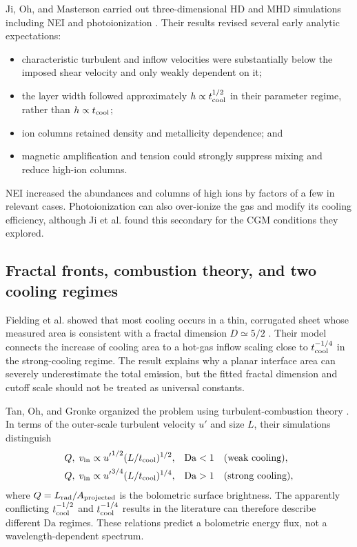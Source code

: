 \documentclass[english,a4paper]{my_memo2}
\newcommand{\tcool}{t_{\rm cool}}
\newcommand{\Da}{\mathrm{Da}}
\begin{document}
Ji, Oh, and Masterson carried out three-dimensional HD and MHD simulations
including NEI and photoionization \cite{Ji2019}.  Their results revised several
early analytic expectations:
\begin{itemize}[leftmargin=*]
\item characteristic turbulent and inflow velocities were substantially below
the imposed shear velocity and only weakly dependent on it;
\item the layer width followed approximately $h\propto\tcool^{1/2}$ in their
parameter regime, rather than $h\propto\tcool$;
\item ion columns retained density and metallicity dependence; and
\item magnetic amplification and tension could strongly suppress mixing and
reduce high-ion columns.
\end{itemize}
NEI increased the abundances and columns of high ions by factors of a few in
relevant cases.  Photoionization can also over-ionize the gas and modify its
cooling efficiency, although Ji et al. found this secondary for the CGM
conditions they explored.

\subsection{Fractal fronts, combustion theory, and two cooling regimes}

Fielding et al. showed that most cooling occurs in a thin, corrugated sheet
whose measured area is consistent with a fractal dimension $D\simeq5/2$
\cite{Fielding2020}.  Their model connects the increase of cooling area to a
hot-gas inflow scaling close to $\tcool^{-1/4}$ in the strong-cooling regime.
The result explains why a planar interface area can severely underestimate the
total emission, but the fitted fractal dimension and cutoff scale should not be
treated as universal constants.

Tan, Oh, and Gronke organized the problem using turbulent-combustion theory
\cite{Tan2021}.  In terms of the outer-scale turbulent velocity $u'$ and size
$L$, their simulations distinguish
\begin{align}
 Q,\;v_{\rm in} &\propto {u'}^{1/2}(L/\tcool)^{1/2},
 &&\Da<1 \quad\text{(weak cooling)}, \label{eq:weakscaling}\\
 Q,\;v_{\rm in} &\propto {u'}^{3/4}(L/\tcool)^{1/4},
 &&\Da>1 \quad\text{(strong cooling)}, \label{eq:strongscaling}
\end{align}
where $Q=L_{\rm rad}/A_{\rm projected}$ is the bolometric surface brightness.
The apparently conflicting $\tcool^{-1/2}$ and $\tcool^{-1/4}$ results in the
literature can therefore describe different $\Da$ regimes.  These relations
predict a bolometric energy flux, not a wavelength-dependent spectrum.
\end{document}
